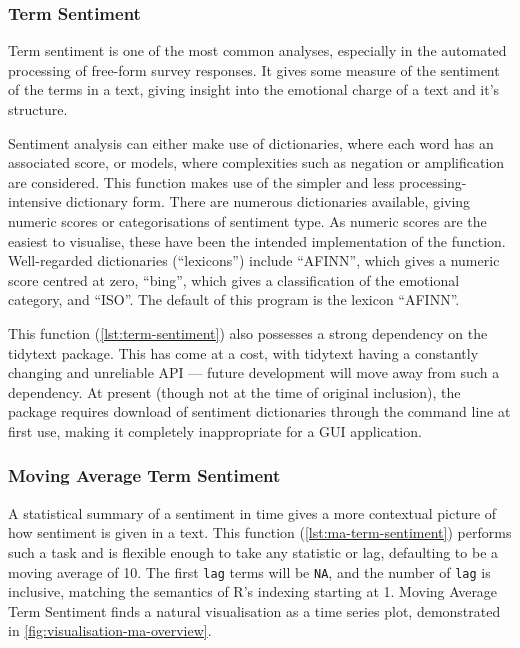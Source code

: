 \message{ !name(jason-cairns-dissertation.tex)}\documentclass[11pt, a4paper, titlepage]{report}
\begin{document}
\subsubsection{Term Sentiment}\label{sec:term-sentiment}

Term sentiment is one of the most common analyses, especially in the
automated processing of free-form survey responses. It gives some
measure of the sentiment of the terms in a text, giving insight into
the emotional charge of a text and it's structure.

Sentiment analysis can either make use of dictionaries, where each
word has an associated score, or models, where complexities such as
negation or amplification are considered. This function makes use of
the simpler and less processing-intensive dictionary form. There are
numerous dictionaries available, giving numeric scores or
categorisations of sentiment type. As numeric scores are the easiest
to visualise, these have been the intended implementation of the
function. Well-regarded dictionaries (``lexicons'') include ``AFINN'',
which gives a numeric score centred at zero, ``bing'', which gives a
classification of the emotional category, and ``ISO''. The default of
this program is the lexicon ``AFINN''.

This function (\cref{lst:term-sentiment}) also possesses a
strong dependency on the tidytext package. This has come at a cost,
with tidytext having a constantly changing and unreliable API ---
future development will move away from such a dependency. At present
(though not at the time of original inclusion), the package requires
download of sentiment dictionaries through the command line at first
use, making it completely inappropriate for a GUI application.

\subsubsection{Moving Average Term Sentiment}\label{sec:moving-average-term}

A statistical summary of a sentiment in time gives a more contextual
picture of how sentiment is given in a text. This function
(\cref{lst:ma-term-sentiment}) performs such a task and is
flexible enough to take any statistic or lag, defaulting to be a
moving average of 10. The first \texttt{lag} terms will be
\texttt{NA}, and the number of \texttt{lag} is
inclusive, matching the semantics of R's indexing starting at 1.
Moving Average Term Sentiment finds a natural visualisation as a time
series plot, demonstrated in \cref{fig:visualisation-ma-overview}.
\end{document}
